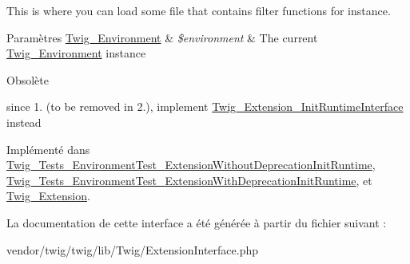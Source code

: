 This is where you can load some file that contains filter functions for instance.


\begin{DoxyParams}[1]{Paramètres}
\hyperlink{class_twig___environment}{Twig\+\_\+\+Environment} & {\em \$environment} & The current \hyperlink{class_twig___environment}{Twig\+\_\+\+Environment} instance\\
\hline
\end{DoxyParams}
\begin{DoxyRefDesc}{Obsolète}
\item[\hyperlink{deprecated__deprecated000015}{Obsolète}]since 1. (to be removed in 2.), implement \hyperlink{interface_twig___extension___init_runtime_interface}{Twig\+\_\+\+Extension\+\_\+\+Init\+Runtime\+Interface} instead \end{DoxyRefDesc}


Implémenté dans \hyperlink{class_twig___tests___environment_test___extension_without_deprecation_init_runtime_a58a853f61d095249f28927c0e40441ff}{Twig\+\_\+\+Tests\+\_\+\+Environment\+Test\+\_\+\+Extension\+Without\+Deprecation\+Init\+Runtime}, \hyperlink{class_twig___tests___environment_test___extension_with_deprecation_init_runtime_a58a853f61d095249f28927c0e40441ff}{Twig\+\_\+\+Tests\+\_\+\+Environment\+Test\+\_\+\+Extension\+With\+Deprecation\+Init\+Runtime}, et \hyperlink{class_twig___extension_ab17a2e5ce3e5789febe1f3a96e61ec38}{Twig\+\_\+\+Extension}.



La documentation de cette interface a été générée à partir du fichier suivant \+:\begin{DoxyCompactItemize}
\item 
vendor/twig/twig/lib/\+Twig/Extension\+Interface.\+php\end{DoxyCompactItemize}
